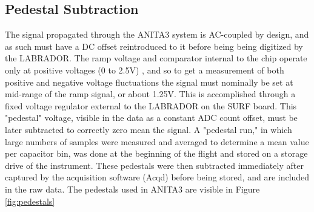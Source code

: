 	\subsection{Pedestal Subtraction}
		The signal propagated through the ANITA3 system is AC-coupled by design, and as such must have a DC offset reintroduced to it before being being digitized by the LABRADOR.  The ramp voltage and comparator internal to the chip operate only at positive voltages (0 to 2.5V) , and so to get a measurement of both positive and negative voltage fluctuations the signal must nominally be set at mid-range of the ramp signal, or about 1.25V.  This is accomplished through a fixed voltage regulator external to the LABRADOR on the SURF board.  This "pedestal" voltage, visible in the data as a constant ADC count offset, must be later subtracted to correctly zero mean the signal.  A "pedestal run," in which large numbers of samples were measured and averaged to determine a mean value per capacitor bin, was done at the beginning of the flight and stored on a storage drive of the instrument.  These pedestals were then subtracted immediately after captured by the acquisition software (Acqd) before being stored, and are included in the raw data.  The pedestals used in ANITA3 are visible in Figure \ref{fig:pedestals}
		
